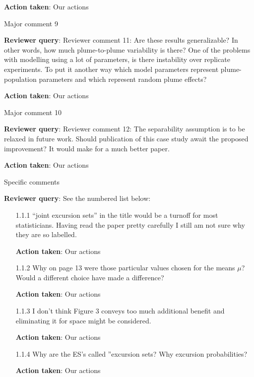 \documentclass[a4paper]{article}
\def\reply{\textbf{Reviewer query}}
\def\action{\textbf{Action taken}}
\begin{document}
\begin{answers}
\action: Our actions

\item{Major comment 9}\label{q9}

\reply: Reviewer comment 11: Are these results generalizable? In other words, how much plume-to-plume variability is there? One of the problems with modelling using a lot of parameters, is there instability over replicate experiments. To put it another way which model parameters represent plume-population parameters and which represent random plume effects?

\action: Our actions

\item{Major comment 10}\label{q10}

\reply: Reviewer comment 12: The separability assumption is to be relaxed in future work. Should publication of this case study await the proposed improvement? It would make for a much better paper.

\action: Our actions

\item{Specific comments}\label{q11}

\reply: See the numbered list below:
\begin{itemize}[noitemsep,topsep=0pt,parsep=0pt,partopsep=0pt]

\item[1.1.1] “joint excursion sets” in the title would be a turnoff for most statisticians. Having read the paper pretty carefully I still am not sure why they are so labelled.\par
\action: Our actions
\vspace{1em}

\item[1.1.2] Why on page 13 were those particular values chosen for the means $\mu$? Would a different choice have made a difference?\par
\action: Our actions
\vspace{1em}

\item[1.1.3] I don’t think Figure 3 conveys too much additional benefit and eliminating it for space might be considered.\par
\action: Our actions
\vspace{1em}

\item[1.1.4] Why are the ES’s called ”excursion sets? Why excursion probabilities?\par
\action: Our actions
\vspace{1em}


\end{itemize}
\end{answers}
\end{document}
